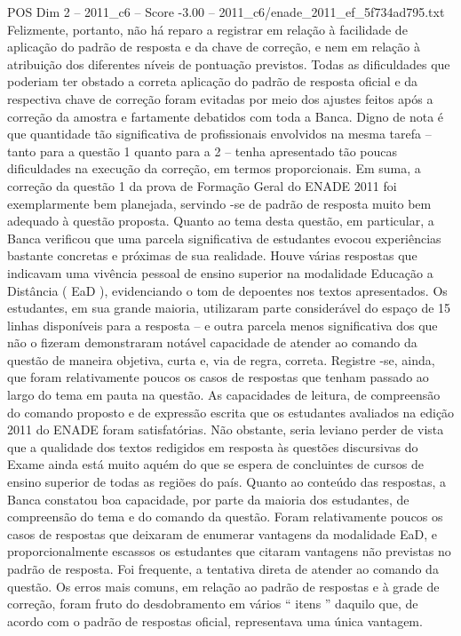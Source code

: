 \begin{textsample}{POS Dim 2 – 2011\_c6 – Score -3.00 – 2011\_c6/enade\_2011\_ef\_5f734ad795.txt}
Felizmente, portanto, não há reparo a registrar em relação à facilidade de aplicação do padrão de resposta e da chave de correção, e nem em relação à atribuição dos diferentes níveis de pontuação previstos.
Todas as dificuldades que poderiam ter obstado a correta aplicação do padrão de resposta oficial e da respectiva chave de correção foram evitadas por meio dos ajustes feitos após a correção da amostra e fartamente debatidos com toda a Banca.
Digno de nota é que quantidade tão significativa de profissionais envolvidos na mesma tarefa – tanto para a questão 1 quanto para a 2 – tenha apresentado tão poucas dificuldades na execução da correção, em termos proporcionais.
Em suma, a correção da questão 1 da prova de Formação Geral do ENADE 2011 foi exemplarmente bem planejada, servindo -se de padrão de resposta muito bem adequado à questão proposta.
Quanto ao tema desta questão, em particular, a Banca verificou que uma parcela significativa de estudantes evocou experiências bastante concretas e próximas de sua realidade.
Houve várias respostas que indicavam uma vivência pessoal de ensino superior na modalidade Educação a Distância ( EaD ), evidenciando o tom de depoentes nos textos apresentados.
Os estudantes, em sua grande maioria, utilizaram parte considerável do espaço de 15 linhas disponíveis para a resposta – e outra parcela menos significativa dos que não o fizeram demonstraram notável capacidade de atender ao comando da questão de maneira objetiva, curta e, via de regra, correta.
Registre -se, ainda, que foram relativamente poucos os casos de respostas que tenham passado ao largo do tema em pauta na questão.
As capacidades de leitura, de compreensão do comando proposto e de expressão escrita que os estudantes avaliados na edição 2011 do ENADE foram satisfatórias.
Não obstante, seria leviano perder de vista que a qualidade dos textos redigidos em resposta às questões discursivas do Exame ainda está muito aquém do que se espera de concluintes de cursos de ensino superior de todas as regiões do país.
Quanto ao conteúdo das respostas, a Banca constatou boa capacidade, por parte da maioria dos estudantes, de compreensão do tema e do comando da questão.
Foram relativamente poucos os casos de respostas que deixaram de enumerar vantagens da modalidade EaD, e proporcionalmente escassos os estudantes que citaram vantagens não previstas no padrão de resposta.
Foi frequente, a tentativa direta de atender ao comando da questão.
Os erros mais comuns, em relação ao padrão de respostas e à grade de correção, foram fruto do desdobramento em vários “ itens ” daquilo que, de acordo com o padrão de respostas oficial, representava uma única vantagem.

\end{textsample}
